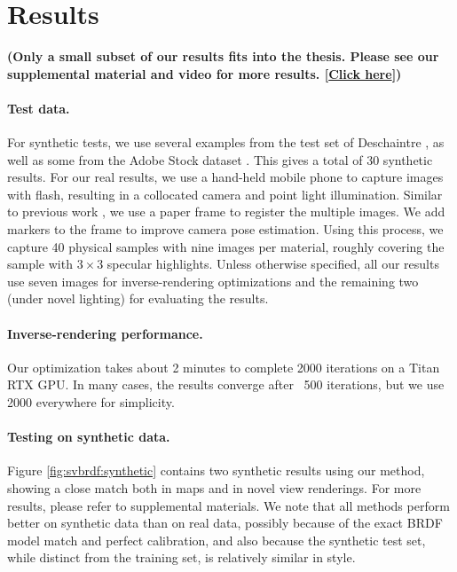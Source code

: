 \section{Results}
\label{sec:svbrdf:results}

\textbf{(Only a small subset of our results fits into the thesis. Please see our supplemental material and video for more results.
[\href{https://www.ics.uci.edu/~yug10/webpage/suppl/2020TOG/index.html}{Click here}])}

\paragraph{Test data.}
For synthetic tests, we use several examples from the test set of Deschaintre \cite{deschaintre2018single}, as well as some from the Adobe Stock dataset \cite{li2018materials}. This gives a total of 30 synthetic results.
For our real results, we use a hand-held mobile phone to capture images with flash, resulting in a collocated camera and point light illumination.
Similar to previous work \cite{hui2017reflectance,deschaintre2019flexible}, we use a paper frame to register the multiple images.
We add markers to the frame to improve camera pose estimation.
Using this process, we capture 40 physical samples with nine images per material, roughly covering the sample with $3 \times 3$ specular highlights. 
Unless otherwise specified, all our results use seven images for inverse-rendering optimizations and the remaining two (under novel lighting) for evaluating the results.

\paragraph{Inverse-rendering performance.}
Our optimization takes about 2 minutes to complete 2000 iterations on a Titan RTX GPU. In many cases, the results converge after ~500 iterations, but we use 2000 everywhere for simplicity.



\paragraph{Testing on synthetic data.}
Figure \ref{fig:svbrdf:synthetic} contains two synthetic results using our method, showing a close match both in maps and in novel view renderings. For more results, please refer to supplemental materials. We note that all methods perform better on synthetic data than on real data, possibly because of the exact BRDF model match and perfect calibration, and also
because the synthetic test set, while distinct from the training set, is relatively similar in style.

